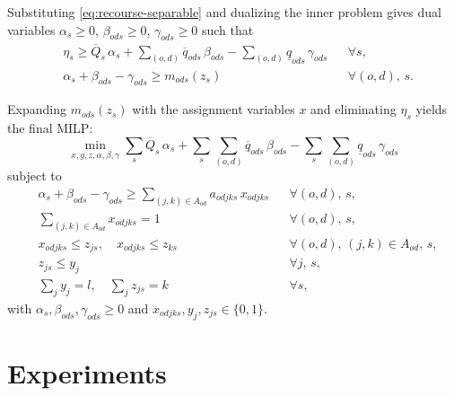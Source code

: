 \documentclass[11pt]{article}
\theoremstyle{definition}
\begin{document}
Substituting \eqref{eq:recourse-separable} and dualizing the inner problem gives dual
variables $\alpha_s \ge 0$, $\beta_{ods} \ge 0$, $\gamma_{ods} \ge 0$ such that
\begin{align}
	 & \eta_s \ge \overline{Q}_s\,\alpha_s
	+ \sum_{(o,d)} \overline{q}_{ods}\,\beta_{ods}
	- \sum_{(o,d)} \underline{q}_{ods}\,\gamma_{ods}
	 &                                                        & \forall s,
	\label{eq:robust-epi-dual}
	\\
	 & \alpha_s + \beta_{ods} - \gamma_{ods} \ge m_{ods}(z_s)
	 &                                                        & \forall (o,d),\, s.
	\label{eq:robust-con}
\end{align}

Expanding $m_{ods}(z_s)$ with the assignment variables $x$ and eliminating
$\eta_s$ yields the final MILP:
\begin{equation}
	\min_{x,y,z,\alpha,\beta,\gamma}
	\sum_s \overline{Q}_s\,\alpha_s
	+ \sum_s\sum_{(o,d)} \overline{q}_{ods}\,\beta_{ods}
	- \sum_s\sum_{(o,d)} \underline{q}_{ods}\,\gamma_{ods}
	\label{eq:robust-counterpart}
\end{equation}
subject to
\begin{align}
	 & \alpha_s + \beta_{ods} - \gamma_{ods} \ge \sum_{(j,k)\in A_{od}} a_{odjks}\,x_{odjks}
	 &                                                                                       & \forall (o,d),\, s,
	\label{eq:robust-con-final}
	\\
	 & \sum_{(j,k)\in A_{od}} x_{odjks} = 1
	 &                                                                                       & \forall (o,d),\, s,
	\label{eq:recourse-counterpart-assign-final}
	\\
	 & x_{odjks} \le z_{js},\quad x_{odjks} \le z_{ks}
	 &                                                                                       & \forall (o,d),\, (j,k)\in A_{od},\, s,
	\label{eq:recourse-counterpart-active-final}
	\\
	 & z_{js} \le y_j
	 &                                                                                       & \forall j,\, s,
	\label{eq:robust-build}
	\\
	 & \sum_j y_j = l,\quad \sum_j z_{js} = k
	 &                                                                                       & \forall s,
	\label{eq:robust-budget}
\end{align}
with $\alpha_s,\beta_{ods},\gamma_{ods}\ge 0$ and $x_{odjks} ,y_j, z_{js} \in \{0,1\}$.

\section{Experiments}
\end{document}

